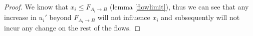 \begin{proof}
   We know that $x_i \leq F_{A_i \rightarrow B}$ (lemma \ref{flowlimit}), thus we can see that any increase in $u_i'$
   beyond $F_{A_i \rightarrow B}$ will not influence $x_i$ and subsequently will not incur any change on the rest of the
   flows.
\end{proof}
